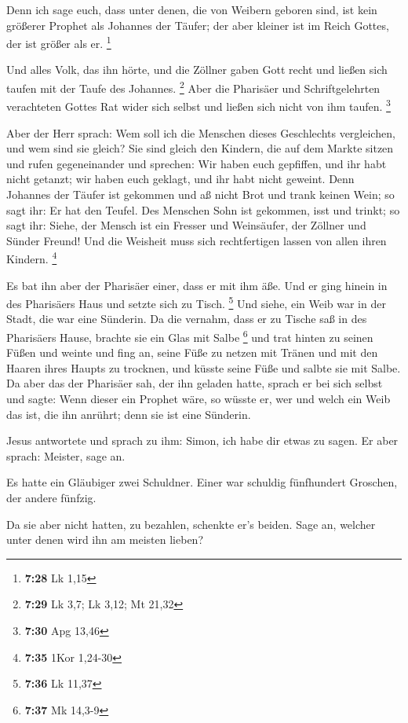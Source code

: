  Denn ich sage euch, dass unter denen, die von Weibern
geboren sind, ist kein größerer Prophet als Johannes der Täufer; der
aber kleiner ist im Reich Gottes, der ist größer als er. \footnote{\textbf{7:28}
  Lk 1,15}

 Und alles Volk, das ihn hörte, und die Zöllner gaben Gott
recht und ließen sich taufen mit der Taufe des Johannes. \footnote{\textbf{7:29}
  Lk 3,7; Lk 3,12; Mt 21,32}  Aber die Pharisäer und
Schriftgelehrten verachteten Gottes Rat wider sich selbst und ließen
sich nicht von ihm taufen. \footnote{\textbf{7:30} Apg 13,46}

 Aber der Herr sprach: Wem soll ich die Menschen dieses
Geschlechts vergleichen, und wem sind sie gleich?  Sie sind
gleich den Kindern, die auf dem Markte sitzen und rufen gegeneinander
und sprechen: Wir haben euch gepfiffen, und ihr habt nicht getanzt; wir
haben euch geklagt, und ihr habt nicht geweint.  Denn
Johannes der Täufer ist gekommen und aß nicht Brot und trank keinen
Wein; so sagt ihr: Er hat den Teufel.  Des Menschen Sohn
ist gekommen, isst und trinkt; so sagt ihr: Siehe, der Mensch ist ein
Fresser und Weinsäufer, der Zöllner und Sünder Freund!  Und
die Weisheit muss sich rechtfertigen lassen von allen ihren Kindern.
\footnote{\textbf{7:35} 1Kor 1,24-30}

 Es bat ihn aber der Pharisäer einer, dass er mit ihm äße.
Und er ging hinein in des Pharisäers Haus und setzte sich zu Tisch.
\footnote{\textbf{7:36} Lk 11,37}  Und siehe, ein Weib war
in der Stadt, die war eine Sünderin. Da die vernahm, dass er zu Tische
saß in des Pharisäers Hause, brachte sie ein Glas mit Salbe \footnote{\textbf{7:37}
  Mk 14,3-9}  und trat hinten zu seinen Füßen und weinte
und fing an, seine Füße zu netzen mit Tränen und mit den Haaren ihres
Haupts zu trocknen, und küsste seine Füße und salbte sie mit Salbe.
 Da aber das der Pharisäer sah, der ihn geladen hatte,
sprach er bei sich selbst und sagte: Wenn dieser ein Prophet wäre, so
wüsste er, wer und welch ein Weib das ist, die ihn anrührt; denn sie ist
eine Sünderin.

 Jesus antwortete und sprach zu ihm: Simon, ich habe dir
etwas zu sagen. Er aber sprach: Meister, sage an.

 Es hatte ein Gläubiger zwei Schuldner. Einer war schuldig
fünfhundert Groschen, der andere fünfzig.

 Da sie aber nicht hatten, zu bezahlen, schenkte er's
beiden. Sage an, welcher unter denen wird ihn am meisten lieben?

